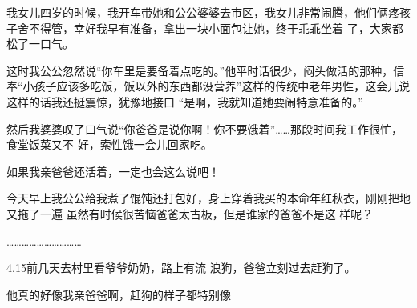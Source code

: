 \documentclass{article}
\begin{document}
我女儿四岁的时候，我开车带她和公公婆婆去市区，我女儿非常闹腾，他们俩疼孩子舍不得管，幸好我早有准备，拿出一块小面包让她，终于乖乖坐着
了，大家都松了一口气。 

这时我公公忽然说“你车里是要备着点吃的。”他平时话很少，闷头做活的那种，信奉“小孩子应该多吃饭，饭以外的东西都没营养”这样的传统中老年男性，这会儿说这样的话我还挺震惊，犹豫地接口
“是啊，我就知道她要闹特意准备的。” 

然后我婆婆叹了口气说“你爸爸是说你啊！你不要饿着”……那段时间我工作很忙，食堂饭菜又不
好，索性饿一会儿回家吃。 

\newpage


如果我亲爸爸还活着，一定也会这么说吧！ 

今天早上我公公给我煮了馄饨还打包好，身上穿着我买的本命年红秋衣，刚刚把地又拖了一遍 虽然有时候很苦恼爸爸太古板，但是谁家的爸爸不是这
样呢？ 


………………………… 

4.15前几天去村里看爷爷奶奶，路上有流
浪狗，爸爸立刻过去赶狗了。 

他真的好像我亲爸爸啊，赶狗的样子都特别像
\end{document}
